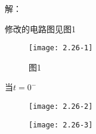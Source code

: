 






解：

\scalebox{3}{（a）}

修改的电路图见图1

		\begin{figure}[H] %
	\begin{minipage}{\linewidth}
		\texttt{[image: 2.26-1]}
	\end{minipage}
	\caption*{图1} %
\end{figure}



\scalebox{2}{（1）}

当$t=0^-$

\begin{figure}[H] %
	\begin{minipage}{\linewidth}
		\texttt{[image: 2.26-2]}
	\end{minipage}
\end{figure}

\begin{figure}[H] %
	\begin{minipage}{\linewidth}
		\texttt{[image: 2.26-3]}
	\end{minipage}
\end{figure}










\color{black}{
	
}

\scalebox{2}{（2）}


